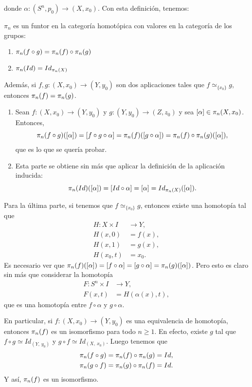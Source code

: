 donde $\alpha : (S^n, p_0) \longrightarrow (X, x_0)$.
Con esta definición, tenemos:
\begin{prop}
$\pi_n$ es un funtor en la categoría homotópica con valores en la categoría de los grupos:
\begin{enumerate}
\item $\pi_{n}(f \circ g) = \pi_{n}(f) \circ \pi_{n}(g)$
\item $\pi_{n}(Id) = Id_{\pi_{n}(X)}$
\end{enumerate}
Además, si $f, g : (X, x_0) \longrightarrow (Y, y_0)$ son dos aplicaciones tales que $f \simeq_{\{x_0\}} g$, entonces $\pi_{n}(f) = \pi_{n}(g)$.
\end{prop}
\begin{demo}
\begin{enumerate}
\item Sean $f: (X, x_0) \longrightarrow (Y, y_0)$ y $g: (Y, y_0) \longrightarrow (Z, z_0)$ y sea $[\alpha] \in \pi_{n}(X, x_0)$. Entonces,
\[
\pi_{n}(f \circ g)([\alpha]) = [f \circ g \circ \alpha] = \pi_{n}(f)([g \circ \alpha]) = \pi_{n}(f) \circ \pi_{n}(g)([\alpha]),
\]
que es lo que se quería probar.
\item Esta parte se obtiene sin más que aplicar la definición de la aplicación inducida:
\[
\pi_{n}(Id)([\alpha]) = [Id \circ \alpha] = [\alpha] = Id_{\pi_{n}(X)}([\alpha]).
\]
\end{enumerate}
Para la última parte, si tenemos que $f \simeq_{\{x_0\}} g$, entonces existe una homotopía tal que
\begin{align*}
H : X \times I &\longrightarrow Y, \\
H(x, 0) &= f(x),\\
H(x, 1) &= g(x), \\
H(x_0, t) &= x_0.
\end{align*}
Es necesario ver que $\pi_{n}(f)([\alpha]) = [ f \circ \alpha]  = [ g \circ \alpha ] = \pi_{n}(g)([\alpha])$. Pero esto es claro sin más que considerar la homotopía
\begin{align*}
F : S^n \times I &\longrightarrow Y, \\
F(x, t) &= H( \alpha(x), t),
\end{align*}
que es una homotopía entre $ f \circ \alpha$ y $ g \circ \alpha$.
\end{demo}

En particular, si $f : (X, x_0) \longrightarrow (Y, y_0)$ es una equivalencia de homotopía, entonces $\pi_{n}(f)$ es un isomorfismo para todo $n \geq 1$. En efecto, existe $g$ tal que $f \circ g \simeq Id_{(Y, \ y_0)}$ y $g \circ f \simeq Id_{(X, \ x_0)}$. 
Luego tenemos que 
\begin{align*}
\pi_{n}(f \circ g) = \pi_{n}(f) \circ \pi_{n}(g) = Id, \\
\pi_{n}(g \circ f) = \pi_{n}(g) \circ \pi_{n}(f) = Id.
\end{align*}
Y así, $\pi_{n}(f)$ es un isomorfismo.

